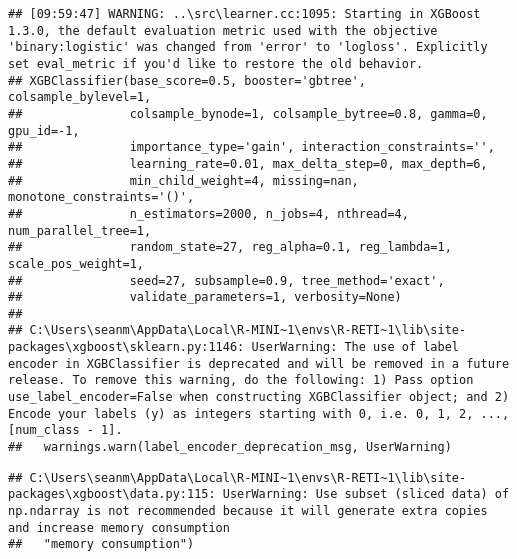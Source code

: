 \documentclass[
  english,
  man]{article}
\begin{document}
\begin{verbatim}
## [09:59:47] WARNING: ..\src\learner.cc:1095: Starting in XGBoost 1.3.0, the default evaluation metric used with the objective 'binary:logistic' was changed from 'error' to 'logloss'. Explicitly set eval_metric if you'd like to restore the old behavior.
## XGBClassifier(base_score=0.5, booster='gbtree', colsample_bylevel=1,
##               colsample_bynode=1, colsample_bytree=0.8, gamma=0, gpu_id=-1,
##               importance_type='gain', interaction_constraints='',
##               learning_rate=0.01, max_delta_step=0, max_depth=6,
##               min_child_weight=4, missing=nan, monotone_constraints='()',
##               n_estimators=2000, n_jobs=4, nthread=4, num_parallel_tree=1,
##               random_state=27, reg_alpha=0.1, reg_lambda=1, scale_pos_weight=1,
##               seed=27, subsample=0.9, tree_method='exact',
##               validate_parameters=1, verbosity=None)
## 
## C:\Users\seanm\AppData\Local\R-MINI~1\envs\R-RETI~1\lib\site-packages\xgboost\sklearn.py:1146: UserWarning: The use of label encoder in XGBClassifier is deprecated and will be removed in a future release. To remove this warning, do the following: 1) Pass option use_label_encoder=False when constructing XGBClassifier object; and 2) Encode your labels (y) as integers starting with 0, i.e. 0, 1, 2, ..., [num_class - 1].
##   warnings.warn(label_encoder_deprecation_msg, UserWarning)
\end{verbatim}

\begin{verbatim}
## C:\Users\seanm\AppData\Local\R-MINI~1\envs\R-RETI~1\lib\site-packages\xgboost\data.py:115: UserWarning: Use subset (sliced data) of np.ndarray is not recommended because it will generate extra copies and increase memory consumption
##   "memory consumption")
\end{verbatim}
\end{document}
